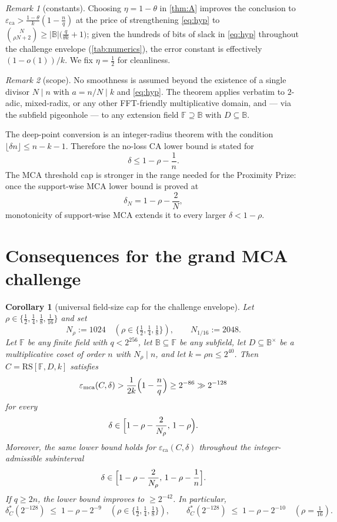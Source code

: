 \documentclass[11pt]{article}
\newtheorem{corollary}[corollary]{Corollary}
\theoremstyle{definition}
\theoremstyle{remark}
\newtheorem{remark}[remark]{Remark}
\newcommand{\F}{\mathbb{F}}
\newcommand{\B}{\mathbb{B}}
\newcommand{\RS}{\mathrm{RS}}
\newcommand{\eca}{\varepsilon_{\mathrm{ca}}}
\newcommand{\emca}{\varepsilon_{\mathrm{mca}}}
\begin{document}
\begin{remark}[constants]\label{rem:eta}
Choosing $\eta=1-\theta$ in \cref{thm:A} improves the conclusion to $\eca>\frac{1-\theta}k(1-\frac nq)$ at the price of strengthening \eqref{eq:hyp} to $\binom N{\rho N+2}\ge|\B|\bigl(\frac q{\theta k}+1\bigr)$; given the hundreds of bits of slack in \eqref{eq:hyp} throughout the challenge envelope (\cref{tab:numerics}), the error constant is effectively $(1-o(1))/k$. We fix $\eta=\frac12$ for cleanliness.
\end{remark}

\begin{remark}[scope]\label{rem:scope}
No smoothness is assumed beyond the existence of a single divisor $N\mid n$ with $a=n/N\mid k$ and \eqref{eq:hyp}. The theorem applies verbatim to $2$-adic, mixed-radix, or any other FFT-friendly multiplicative domain, and --- via the subfield pigeonhole --- to any extension field $\F\supseteq\B$ with $D\subseteq\B$.

The deep-point conversion is an integer-radius theorem with the condition $\lfloor\delta n\rfloor\le n-k-1$. Therefore the no-loss CA lower bound is stated for
\[
        \delta \le 1-\rho-\frac1n .
\]
The MCA threshold cap is stronger in the range needed for the Proximity Prize: once the support-wise MCA lower bound is proved at
\[
        \delta_N=1-\rho-\frac2N,
\]
monotonicity of support-wise MCA extends it to every larger $\delta<1-\rho$.
\end{remark}

\section{Consequences for the grand MCA challenge}\label{sec:grand}

\begin{corollary}[universal field-size cap for the challenge envelope]\label{cor:grand}
Let $\rho\in\{\frac12,\frac14,\frac18,\frac1{16}\}$ and set
\[
N_\rho:=1024\quad(\rho\in\{\tfrac12,\tfrac14,\tfrac18\}),\qquad N_{1/16}:=2048 .
\]
Let $\F$ be any finite field with $q<2^{256}$, let $\B\subseteq\F$ be any subfield, let $D\subseteq\B^\times$ be a multiplicative coset of order $n$ with $N_\rho\mid n$, and let $k=\rho n\le2^{40}$. Then $C=\RS[\F,D,k]$ satisfies
\[
\emca(C,\delta)
>
\frac1{2k}\Bigl(1-\frac nq\Bigr)
\ge
2^{-86}
\gg
2^{-128}
\]
for every
\[
        \delta\in
        \Bigl[1-\rho-\frac2{N_\rho},\,1-\rho\Bigr).
\]
Moreover, the same lower bound holds for $\eca(C,\delta)$ throughout the integer-admissible subinterval
\[
        \delta\in
        \Bigl[1-\rho-\frac2{N_\rho},\,1-\rho-\frac1n\Bigr].
\]
If $q\ge2n$, the lower bound improves to $\ge2^{-42}$. In particular,
\[
\delta^*_C(2^{-128})\;\le\;1-\rho-2^{-9}\quad(\rho\in\{\tfrac12,\tfrac14,\tfrac18\}),
\qquad
\delta^*_C(2^{-128})\;\le\;1-\rho-2^{-10}\quad(\rho=\tfrac1{16}).
\]
\end{corollary}
\end{document}
